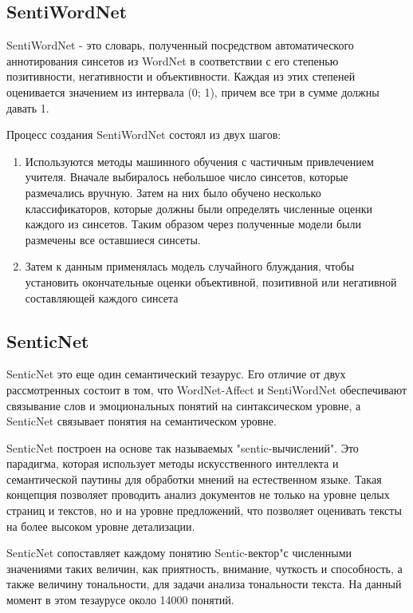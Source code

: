 \subsection{SentiWordNet}
SentiWordNet - это словарь, полученный посредством автоматического аннотирования
синсетов из WordNet в соответствии с его степенью позитивности, негативности и
объективности. Каждая из этих степеней оценивается значением из интервала (0;
1), причем все три в сумме должны давать 1.

Процесс создания SentiWordNet состоял из двух шагов:
\begin{enumerate}
\item Используются методы машинного обучения с частичным привлечением учителя.
  Вначале выбиралось небольшое число синсетов, которые размечались вручную.
  Затем на них было обучено несколько классификаторов, которые должны
  были определять численные оценки каждого из синсетов. Таким образом через
  полученные модели были размечены все оставшиеся синсеты. 
\item Затем к данным применялась модель случайного блуждания, чтобы установить
  окончательные оценки объективной, позитивной или негативной составляющей
  каждого синсета
\end{enumerate}

\subsection{SenticNet}
SenticNet это еще один семантический тезаурус. Его отличие от двух рассмотренных
состоит в том, что WordNet-Affect и SentiWordNet обеспечивают связывание
слов и эмоциональных понятий на синтаксическом уровне, а SenticNet связывает
понятия на семантическом уровне.

SenticNet построен на основе так называемых "sentic-вычислений". Это парадигма,
которая использует методы искусственного интеллекта и семантической паутины для
обработки мнений на естественном языке. Такая концепция позволяет
проводить анализ документов не только на уровне целых страниц и текстов, но и
на уровне предложений, что позволяет оценивать тексты на более высоком уровне
детализации.

SenticNet сопоставляет каждому понятию Sentic-вектор"с численными значениями
таких величин, как приятность, внимание, чуткость и способность, а также
величину тональности, для задачи анализа тональности текста. На данный момент в
этом тезаурусе около 14000 понятий.

\FloatBarrier

